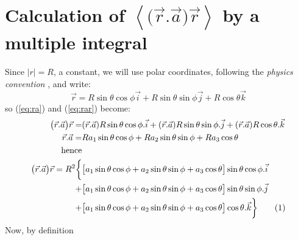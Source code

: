 \documentclass[]{article}
\newcommand\numberthis{\addtocounter{equation}{1}\tag{\theequation}}
\begin{document}
\section{Calculation of $\left\langle \big(\vec{r}.\vec{a}\big)\vec{r} \right\rangle$ by a multiple integral}
Since $|r|=R$, a constant, we will use polar coordinates, following the \emph{physics convention} \cite{schaum-basic} \cite{wiki-polar}, and write:
$$\vec{r}=R\sin\theta\cos\phi\vec{i}+R\sin\theta\sin\phi\vec{j}+R\cos\theta\vec{k}$$
so (\ref{eq:ra}) and (\ref{eq:rar}) become:
\begin{align*}
\big(\vec{r}.\vec{a}\big)\vec{r} =& (\vec{r}.\vec{a}) R \sin\theta\cos\phi .\vec{i} + (\vec{r}.\vec{a})R\sin\theta\sin\phi . \vec{j} + (\vec{r}.\vec{a}) R\cos\theta. \vec{k}\\
\vec{r}.\vec{a} =& Ra_1\sin\theta\cos\phi + Ra_2\sin\theta\sin\phi + Ra_3 \cos\theta\\
\text{hence}&\\
\big(\vec{r}.\vec{a}\big)\vec{r} = R^2 \bigg\{& \big[a_1\sin\theta\cos\phi + a_2\sin\theta\sin\phi + a_3 \cos\theta\big] \sin\theta\cos\phi.\vec{i}\\ +& \big[a_1\sin\theta\cos\phi + a_2\sin\theta\sin\phi + a_3 \cos\theta\big]\sin\theta\sin\phi. \vec{j}\\
 +& \big[a_1\sin\theta\cos\phi + a_2\sin\theta\sin\phi + a_3 \cos\theta\big] \cos\theta. \vec{k}\bigg\}\numberthis \label{eq:rar_expanded}
\end{align*}
Now, by definition
\end{document}
